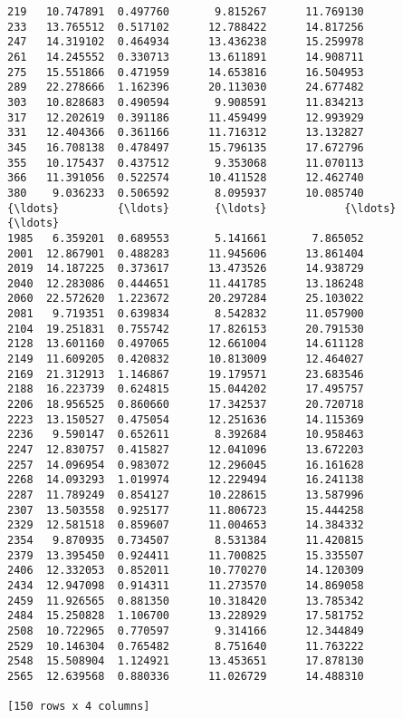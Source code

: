 \documentclass[11pt]{article}
\begin{document}
\begin{Verbatim}[commandchars=\\\{\}]
219   10.747891  0.497760       9.815267      11.769130
233   13.765512  0.517102      12.788422      14.817256
247   14.319102  0.464934      13.436238      15.259978
261   14.245552  0.330713      13.611891      14.908711
275   15.551866  0.471959      14.653816      16.504953
289   22.278666  1.162396      20.113030      24.677482
303   10.828683  0.490594       9.908591      11.834213
317   12.202619  0.391186      11.459499      12.993929
331   12.404366  0.361166      11.716312      13.132827
345   16.708138  0.478497      15.796135      17.672796
355   10.175437  0.437512       9.353068      11.070113
366   11.391056  0.522574      10.411528      12.462740
380    9.036233  0.506592       8.095937      10.085740
{\ldots}         {\ldots}       {\ldots}            {\ldots}            {\ldots}
1985   6.359201  0.689553       5.141661       7.865052
2001  12.867901  0.488283      11.945606      13.861404
2019  14.187225  0.373617      13.473526      14.938729
2040  12.283086  0.444651      11.441785      13.186248
2060  22.572620  1.223672      20.297284      25.103022
2081   9.719351  0.639834       8.542832      11.057900
2104  19.251831  0.755742      17.826153      20.791530
2128  13.601160  0.497065      12.661004      14.611128
2149  11.609205  0.420832      10.813009      12.464027
2169  21.312913  1.146867      19.179571      23.683546
2188  16.223739  0.624815      15.044202      17.495757
2206  18.956525  0.860660      17.342537      20.720718
2223  13.150527  0.475054      12.251636      14.115369
2236   9.590147  0.652611       8.392684      10.958463
2247  12.830757  0.415827      12.041096      13.672203
2257  14.096954  0.983072      12.296045      16.161628
2268  14.093293  1.019974      12.229494      16.241138
2287  11.789249  0.854127      10.228615      13.587996
2307  13.503558  0.925177      11.806723      15.444258
2329  12.581518  0.859607      11.004653      14.384332
2354   9.870935  0.734507       8.531384      11.420815
2379  13.395450  0.924411      11.700825      15.335507
2406  12.332053  0.852011      10.770270      14.120309
2434  12.947098  0.914311      11.273570      14.869058
2459  11.926565  0.881350      10.318420      13.785342
2484  15.250828  1.106700      13.228929      17.581752
2508  10.722965  0.770597       9.314166      12.344849
2529  10.146304  0.765482       8.751640      11.763222
2548  15.508904  1.124921      13.453651      17.878130
2565  12.639568  0.880336      11.026729      14.488310

[150 rows x 4 columns]

    \end{Verbatim}
\end{document}
